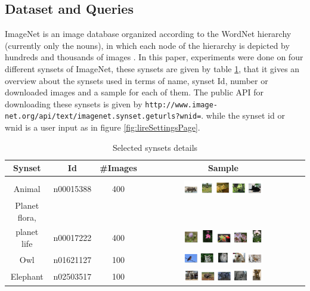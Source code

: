 \documentclass[11pt]{article}
\begin{document}
\subsection{Dataset and Queries}

ImageNet is an image database organized according to the WordNet hierarchy (currently only the nouns), in which each node of the hierarchy is depicted by hundreds and thousands of images \cite{deng2009imagenet}. In this paper, experiments were done on four different synsets of ImageNet, these synsets are given by table \ref{tbl:synsets}, that it gives an overview about the synsets used in terms of name, synset Id, number or downloaded images and a sample for each of them. The public API for downloading these synsets is given by \texttt{http://www.image-net.org/api/text/imagenet.synset.geturls?wnid=}. while the synset id or wnid is a user input as in figure \ref{fig:lireSettingsPage}.



\begin{table}
\caption{Selected synsets details}
\begin{tabular}{cccc}

		\hline
		Synset & Id & \#Images & Sample \\ \hline
		\\
		Animal & n00015388 & 400 &
		\includegraphics[width=0.5\textwidth]{AnimalSynset}	
		\\
		Planet flora,
		\\ planet life  & n00017222 & 400 &
		\includegraphics[width=0.5\textwidth]{HerbsSynset}	
		\\
		 Owl  & n01621127 & 100 &
		\includegraphics[width=0.5\textwidth]{OwlSynset}	
		\\
			Elephant  & n02503517 & 100 &
		\includegraphics[width=0.5\textwidth]{ElephantSynset}	
		\\ \hline
\end{tabular}

\label{tbl:synsets}
\end{table}
\end{document}
